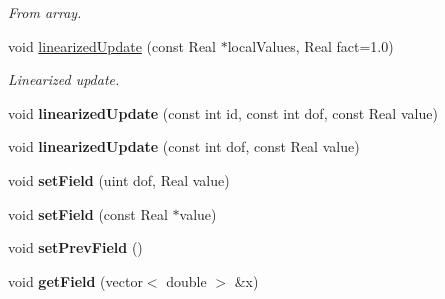 \begin{DoxyCompactItemize}
\begin{DoxyCompactList}\small\item\em From array. \item\end{DoxyCompactList}\item 
\hypertarget{classvoom_1_1_poisson_model_a5722990a785e745f112166841f6c828e}{
void \hyperlink{classvoom_1_1_poisson_model_a5722990a785e745f112166841f6c828e}{linearizedUpdate} (const Real $\ast$localValues, Real fact=1.0)}
\label{classvoom_1_1_poisson_model_a5722990a785e745f112166841f6c828e}

\begin{DoxyCompactList}\small\item\em Linearized update. \item\end{DoxyCompactList}\item 
\hypertarget{classvoom_1_1_poisson_model_a87b6ce39234402175a8e013195fd67b7}{
void {\bfseries linearizedUpdate} (const int id, const int dof, const Real value)}
\label{classvoom_1_1_poisson_model_a87b6ce39234402175a8e013195fd67b7}

\item 
\hypertarget{classvoom_1_1_poisson_model_a32d75d3425514ae500ed114ca1602d26}{
void {\bfseries linearizedUpdate} (const int dof, const Real value)}
\label{classvoom_1_1_poisson_model_a32d75d3425514ae500ed114ca1602d26}

\item 
\hypertarget{classvoom_1_1_poisson_model_ad2c5fd263fd83a5f658795d015b61ffb}{
void {\bfseries setField} (uint dof, Real value)}
\label{classvoom_1_1_poisson_model_ad2c5fd263fd83a5f658795d015b61ffb}

\item 
\hypertarget{classvoom_1_1_poisson_model_a48a0505273d667ad080c6644df9a557d}{
void {\bfseries setField} (const Real $\ast$value)}
\label{classvoom_1_1_poisson_model_a48a0505273d667ad080c6644df9a557d}

\item 
\hypertarget{classvoom_1_1_poisson_model_a753269675e38528ea7b19d97641b4cca}{
void {\bfseries setPrevField} ()}
\label{classvoom_1_1_poisson_model_a753269675e38528ea7b19d97641b4cca}

\item 
\hypertarget{classvoom_1_1_poisson_model_ab4e2aea1aa9ed07af4bb9586adfd6d03}{
void {\bfseries getField} (vector$<$ double $>$ \&x)}
\label{classvoom_1_1_poisson_model_ab4e2aea1aa9ed07af4bb9586adfd6d03}


\end{DoxyCompactItemize}
